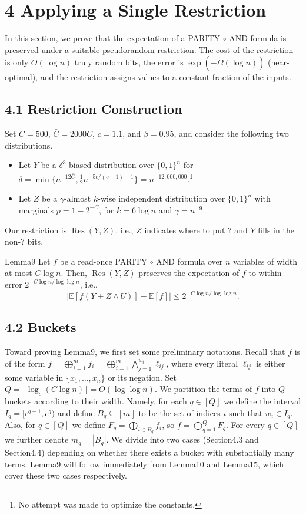 \section*{4 Applying a Single Restriction}
In this section, we prove that the expectation of a PARITY $\circ$ AND formula is preserved under a suitable pseudorandom restriction. The cost of the restriction is only $O(\log n)$ truly random bits, the error is $\exp(-\widetilde\Omega(\log n))$ (near-optimal), and the restriction assigns values to a constant fraction of the inputs.
\subsection*{4.1 Restriction Construction}
Set $C=500$, $\bar C=2000C$, $c=1.1$, and $\beta=0.95$, and consider the following two distributions.
\begin{itemize}
\item Let $Y$ be a $\delta^3$-biased distribution over $\{0,1\}^n$ for $\delta=\min\{n^{-12\bar C},\frac12n^{-5c/(c-1)-1}\}=n^{-12,000,000}$.\footnote{No attempt was made to optimize the constants.}
\item Let $Z$ be a $\gamma$-almost $k$-wise independent distribution over $\{0,1\}^n$ with marginals $p=1-2^{-C}$, for $k=6\log n$ and $\gamma=n^{-9}$.
\end{itemize}
Our restriction is $\operatorname{Res}(Y,Z)$, i.e., $Z$ indicates where to put ? and $Y$ fills in the non-? bits.
\begin{authorclaim}{Lemma9}
Let $f$ be a read-once PARITY $\circ$ AND formula over $n$ variables of width at most $C\log n$. Then, $\operatorname{Res}(Y,Z)$ preserves the expectation of $f$ to within error $2^{-C\log n/\log\log n}$, i.e.,
\[
|\mathbb E[f(Y+Z\wedge U)]-\mathbb E[f]|\le2^{-C\log n/\log\log n}.
\]
\end{authorclaim}
\subsection*{4.2 Buckets}
Toward proving Lemma9, we first set some preliminary notations. Recall that $f$ is of the form $f=\bigoplus_{i=1}^mf_i=\bigoplus_{i=1}^m\bigwedge_{j=1}^{w_i}\ell_{ij}$, where every literal $\ell_{ij}$ is either some variable in $\{x_1,\ldots,x_n\}$ or its negation.
Set $Q=\lceil\log_c(C\log n)\rceil=O(\log\log n)$. We partition the terms of $f$ into $Q$ buckets according to their width. Namely, for each $q\in[Q]$ we define the interval $I_q=[c^{q-1},c^q)$ and define $B_q\subseteq[m]$ to be the set of indices $i$ such that $w_i\in I_q$. Also, for $q\in[Q]$ we define $F_q=\bigoplus_{i\in B_q}f_i$, so $f=\bigoplus_{q=1}^QF_q$. For every $q\in[Q]$ we further denote $m_q=|B_q|$.
We divide into two cases (Section4.3 and Section4.4) depending on whether there exists a bucket with substantially many terms. Lemma9 will follow immediately from Lemma10 and Lemma15, which cover these two cases respectively.
